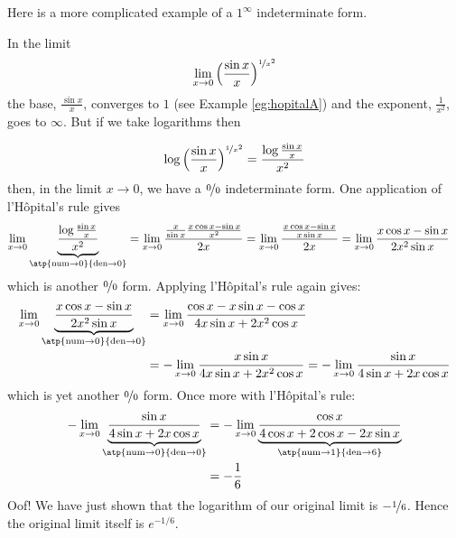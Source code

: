 \begin{enumerate}[(a)]
\begin{eg}
\end{eg}\goodbreak
Here is a more complicated example of a  $1^\infty$ indeterminate form.
\begin{eg}\label{eg:hopitalLL}
In the limit
\begin{align*}
\lim_{x\rightarrow 0}\Big(\frac{\sin x}{x}\Big)^{\nicefrac{1}{x^2}}
\end{align*}
the base, $\frac{\sin x}{x}$, converges to $1$ (see Example \ref{eg:hopitalA})
and the exponent, $\frac{1}{x^2}$, goes to $\infty$. But if we take logarithms then

\begin{align*}
\log \Big(\frac{\sin x}{x}\Big)^{\nicefrac{1}{x^2}}
= \frac{\log\frac{\sin x}{x}}{x^2}
\end{align*}
then, in the limit $x\rightarrow 0$, we have a $\nicefrac{0}{0}$ indeterminate form. One
application of l'H\^opital's rule gives
\begin{align*}
\lim_{x\rightarrow 0}\underbrace{\frac{\log\frac{\sin x}{x}}{x^2}}_{\atp
        {\mathrm{num}\rightarrow 0}
        {\mathrm{den}\rightarrow 0}}
& =\lim_{x\rightarrow 0}
        \frac {\frac{x}{\sin x}\frac{x\cos x -\sin x}{x^2} }{2x}
=\lim_{x\rightarrow 0}
          \frac{ \frac{x\cos x -\sin x}{x\sin x} }{2x}
=\lim_{x\rightarrow 0} \frac{x\cos x -\sin x}{2x^2\sin x}
\end{align*}
which is another $\nicefrac00$ form. Applying l'H\^opital's rule again gives:
\begin{align*}
\lim_{x\rightarrow 0}\underbrace{
          \frac{x\cos x -\sin x}{2x^2\sin x} }_{\atp
        {\mathrm{num}\rightarrow 0}
        {\mathrm{den}\rightarrow 0}}
&=\lim_{x\rightarrow 0}
          \frac{\cos x -x\sin x-\cos x}{4x\sin x+2x^2\cos x}\\
&=-\lim_{x\rightarrow 0}
          \frac{x\sin x}{4x\sin x+2x^2\cos x}
=-\lim_{x\rightarrow 0}
          \frac{\sin x}{4\sin x+2x\cos x}
\end{align*}
which is yet another $\nicefrac00$ form. Once more with l'H\^opital's rule:
\begin{align*}
-\lim_{x\rightarrow 0}\underbrace{
          \frac{\sin x}{4\sin x+2x\cos x} }_{\atp
        {\mathrm{num}\rightarrow 0}
        {\mathrm{den}\rightarrow 0}}
&=-\lim_{x\rightarrow 0}\underbrace{
          \frac{\cos x}{4\cos x+2\cos x-2x\sin x} }_{\atp
        {\mathrm{num}\rightarrow 1}
        {\mathrm{den}\rightarrow 6}} \\
&=-\frac{1}{6}
\end{align*}
Oof! We have just shown that the logarithm of our original limit is
$-\nicefrac{1}{6}$. Hence the original limit itself is $e^{-1/6}$.


\end{eg}
\end{enumerate}
